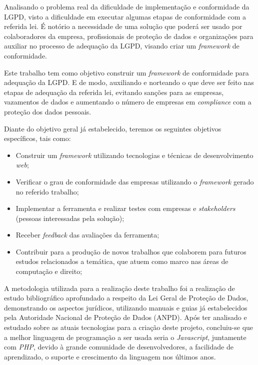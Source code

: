 \documentclass[
	12pt,				%
	openright,			%
	oneside,			%
	a4paper,			%
	english,			%
	french,				%
	spanish,			%
	brazil,				%
	]{abntex2}
\begin{document}
Analisando o problema real da dificuldade de implementação e conformidade da LGPD, visto a dificuldade em executar algumas etapas de conformidade com a referida lei. É notório a necessidade de uma solução que poderá ser usado por colaboradores da empresa, profissionais de proteção de dados e organizações para auxiliar no processo de adequação da LGPD, visando criar um \textit{framework} de conformidade. 

Este trabalho tem como objetivo construir um \textit{framework} de conformidade para adequação da LGPD. E de modo, auxiliando e norteando o que deve ser feito nas etapas de adequação da referida lei, evitando sanções para as empresas, vazamentos de dados e aumentando o número de empresas em \textit{compliance} com a proteção dos dados pessoais.

Diante do objetivo geral já estabelecido, teremos os seguintes objetivos específicos, tais como:
\begin{itemize}
\item Construir um \textit{framework} utilizando tecnologias e técnicas de desenvolvimento \textit{web};
\item Verificar o grau de conformidade das empresas utilizando o \textit{framework} gerado no referido trabalho;
\item Implementar a ferramenta e realizar testes com empresas e \textit{stakeholders} (pessoas interessadas pela solução);
\item Receber \textit{feedback} das avaliações da ferramenta;
\item Contribuir para a produção de novos trabalhos que colaborem para futuros estudos relacionados a temática, que atuem como marco nas áreas de computação e direito;
\end{itemize}

A metodologia utilizada para a realização deste trabalho foi a realização de estudo bibliográfico aprofundado a respeito da Lei Geral de Proteção de Dados, demonstrando os aspectos jurídicos, utilizando manuais e guias já estabelecidos pela Autoridade Nacional de Proteção de Dados (ANPD). Após ter analisado e estudado sobre as atuais tecnologias para a criação deste projeto, concluiu-se que a melhor linguagem de programação a ser usada seria o \textit{Javascript}, juntamente com \textit{PHP}, devido à grande comunidade de desenvolvedores, a facilidade de aprendizado, o suporte e crescimento da linguagem nos últimos anos.
\end{document}
